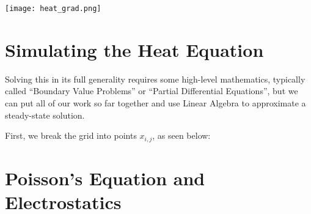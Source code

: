 \documentclass{ximera}
\begin{document}
\begin{center}
    \texttt{[image: heat\_grad.png]}
\end{center}

\section{Simulating the Heat Equation}

Solving this in its full generality requires some high-level mathematics, typically called  ``Boundary Value Problems'' or ``Partial Differential Equations'', but we can put all of our work so far together and use Linear Algebra to approximate a steady-state solution.

First, we break the grid into points $x_{i,j}$, as seen below:

\section{Poisson's Equation and Electrostatics}
\end{document}
